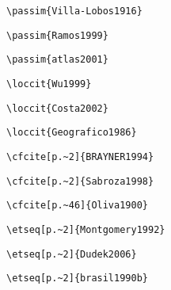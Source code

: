 \begin{alineas}
\begin{verbatim}
\passim{Villa-Lobos1916}
\end{verbatim}

\begin{verbatim}
\passim{Ramos1999}
\end{verbatim}

\begin{verbatim}
\passim{atlas2001}
\end{verbatim}

\begin{verbatim}
\loccit{Wu1999}
\end{verbatim}

\begin{verbatim}
\loccit{Costa2002}
\end{verbatim}

\begin{verbatim}
\loccit{Geografico1986}
\end{verbatim}

\begin{verbatim}
\cfcite[p.~2]{BRAYNER1994}
\end{verbatim}

\begin{verbatim}
\cfcite[p.~2]{Sabroza1998}
\end{verbatim}

\begin{verbatim}
\cfcite[p.~46]{Oliva1900}
\end{verbatim}

\begin{verbatim}
\etseq[p.~2]{Montgomery1992}
\end{verbatim}

\begin{verbatim}
\etseq[p.~2]{Dudek2006}
\end{verbatim}

\begin{verbatim}
\etseq[p.~2]{brasil1990b}
\end{verbatim}

\end{alineas}

